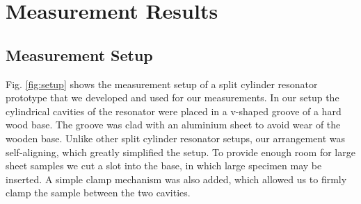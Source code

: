 \chapter{Measurement Results}\label{ch:results}
\section{Measurement Setup}
Fig. \ref{fig:setup} shows the measurement setup of a split cylinder resonator prototype that we developed and used for our measurements. In our setup the cylindrical cavities of the resonator were placed in a v-shaped groove of a hard wood base. The groove was clad with an aluminium sheet to avoid wear of the wooden base. Unlike other split cylinder resonator setups, our arrangement was self-aligning, which greatly simplified the setup. To provide enough room for large sheet samples we cut a slot into the base, in which large specimen may be inserted. A simple clamp mechanism was also added, which allowed us to firmly clamp the sample between the two cavities.

